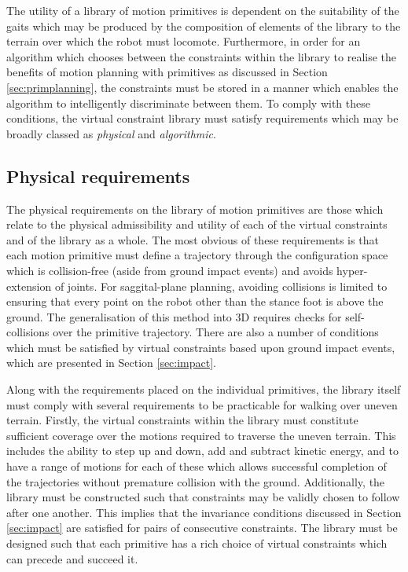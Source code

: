 The utility of a library of motion primitives is dependent on the suitability of the gaits which may be produced by the composition of elements of the library to the terrain over which the robot must locomote. Furthermore, in order for an algorithm which chooses between the constraints within the library to realise the benefits of motion planning with primitives as discussed in Section \ref{sec:primplanning}, the constraints must be stored in a manner which enables the algorithm to intelligently discriminate between them. To comply with these conditions, the virtual constraint library must satisfy requirements which may be broadly classed as \textit{physical} and \textit{algorithmic}.

\subsection{Physical requirements}
The physical requirements on the library of motion primitives are those which relate to the physical admissibility and utility of each of the virtual constraints and of the library as a whole. The most obvious of these requirements is that each motion primitive must define a trajectory through the configuration space which is collision-free (aside from ground impact events) and avoids hyper-extension of joints. For saggital-plane planning, avoiding collisions is limited to ensuring that every point on the robot other than the stance foot is above the ground. The generalisation of this method into 3D requires checks for self-collisions over the primitive trajectory. There are also a number of conditions which must be satisfied by virtual constraints based upon ground impact events, which are presented in Section \ref{sec:impact}.

Along with the requirements placed on the individual primitives, the library itself must comply with several requirements to be practicable for walking over uneven terrain. Firstly, the virtual constraints within the library must constitute sufficient coverage over the motions required to traverse the uneven terrain. This includes the ability to step up and down, add and subtract kinetic energy, and to have a range of motions for each of these which allows successful completion of the trajectories without premature collision with the ground. Additionally, the library must be constructed such that constraints may be validly chosen to follow after one another. This implies that the invariance conditions discussed in Section \ref{sec:impact} are satisfied for pairs of consecutive constraints. The library must be designed such that each primitive has a rich choice of virtual constraints which can precede and succeed it.


